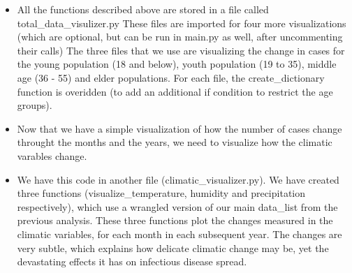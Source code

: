 \documentclass[fontsize=11pt]{article}
\begin{document}
\begin{itemize}
        \item All the functions described above are stored in a file called total\_data\_visulizer.py
        These files are imported for four more visualizations (which are optional, but can be run in main.py as well, after uncommenting their calls)
        The three files that we use are visualizing the change in cases for the young population (18 and below), youth population (19 to 35), middle age (36 - 55) and elder populations. For each file, the create\_dictionary function is overidden (to add an additional if condition to restrict the age groups).

        \item Now that we have a simple visualization of how the number of cases change throught the months and the years, we need to visualize how the climatic varables change.

        \item We have this code in another file (climatic\_visualizer.py).
        We have created three functions (visualize\_temperature, humidity and precipitation respectively), which use a wrangled version of our main data\_list from the previous analysis. These three functions plot the changes measured in the climatic variables, for each month in each subsequent year. The changes are very subtle, which explains how delicate climatic change may be, yet the devastating effects it has on infectious disease spread.

    \end{itemize}
\end{document}
